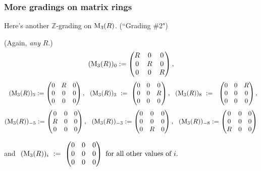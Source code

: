 \documentclass{beamer}
\begin{document}
\begin{frame}
\frametitle{More gradings on matrix rings}
Here's another   $\mathbb{Z}$-grading on ${\rm M}_3(R)$.     (``Grading $\#$2")  
  
   (Again, {\it any} $R$.)
\scriptsize
$$ ( {\rm M}_3(R) )_0  :=   \begin{pmatrix}
R & 0 & 0 \\
0  & R & 0 \\
0 &  0 & R
\end{pmatrix},  $$
$$ \ \   ( {\rm M}_3(R) )_5  :=   \begin{pmatrix}
0 & R & 0 \\
0  & 0 & 0 \\
0 & 0 & 0 
\end{pmatrix}, \ \  ( {\rm M}_3(R) )_{3} \ := \   \begin{pmatrix}
0 & 0 & 0 \\
0   & 0 & R \\
0 & 0 & 0
\end{pmatrix}, \ \ 
 ( {\rm M}_3(R) )_{8}  \  :=  \ \   \begin{pmatrix}
0 & 0 & R \\
0  & 0 & 0 \\
0 & 0 & 0
\end{pmatrix}, $$
 $$    ( {\rm M}_3(R) )_{-5}  :=   \begin{pmatrix}
0 & 0 & 0 \\
R  & 0 & 0 \\
0 & 0 & 0 
\end{pmatrix}, \ \   ( {\rm M}_3(R) )_{-3}  :=   \begin{pmatrix}
0 & 0 & 0 \\
0  & 0 & 0 \\
0 & R & 0 
\end{pmatrix},
 \ \   ( {\rm M}_3(R) )_{-8}  :=   \begin{pmatrix}
0 & 0 & 0 \\
0  & 0 & 0 \\
R &0 & 0 
\end{pmatrix}
$$

\bigskip

and $    \  ( {\rm M}_3(R) )_{i} \ := \   \begin{pmatrix}
0 & 0 & 0 \\
0   & 0 & 0 \\
0 & 0 & 0
\end{pmatrix} \mbox{ for all other values of  }  i  .$




\normalsize



\end{frame}
\end{document}
